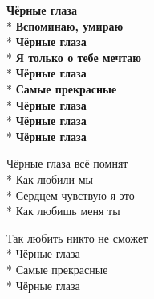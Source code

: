 \begin{minipage}{\linewidth}
\hspace*{1.5em}\textbf{Чёрные глаза}\\*
\hspace*{1.5em}\textbf{Вспоминаю, умираю}\\*
\hspace*{1.5em}\textbf{Чёрные глаза}\\*
\hspace*{1.5em}\textbf{Я только о тебе мечтаю}\\*
\hspace*{1.5em}\textbf{Чёрные глаза}\\*
\hspace*{1.5em}\textbf{Самые прекрасные}\\*
\hspace*{1.5em}\textbf{Чёрные глаза}\\*
\hspace*{1.5em}\textbf{Чёрные глаза}\\*
\hspace*{1.5em}\textbf{Чёрные глаза}\\
\end{minipage}\par\medskip\nobreak

\medskip

\begin{minipage}{\linewidth}
Чёрные глаза всё помнят\\*
Как любили мы\\*
Сердцем чувствую я это\\*
Как любишь меня ты\\
\end{minipage}\par\medskip\nobreak

\medskip

\begin{minipage}{\linewidth}
Так любить никто не сможет\\*
Чёрные глаза\\*
Самые прекрасные\\*
Чёрные глаза\\
\end{minipage}\par\medskip\nobreak

\medskip

